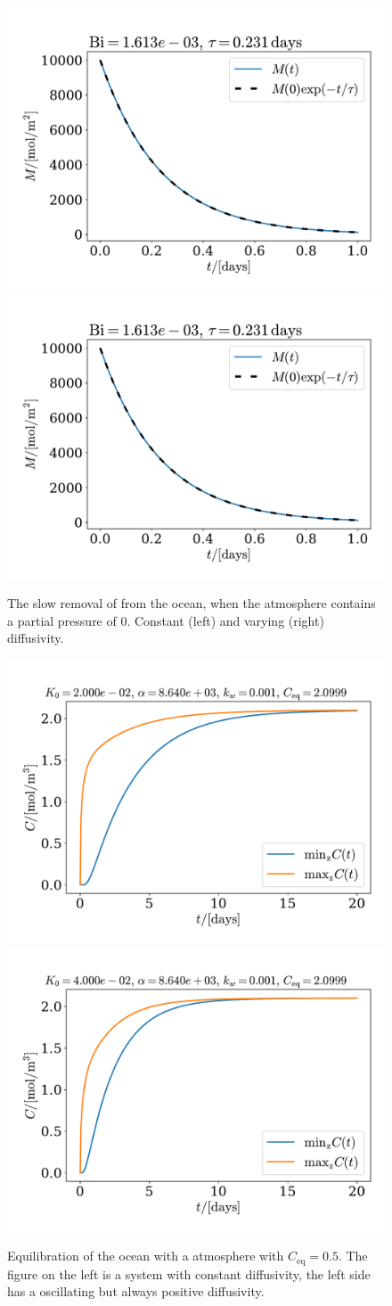 \documentclass{article}
\begin{document}
    \begin{figure}[H]
        \centering
        \includegraphics[width=.49\textwidth]{../plots/test4_decay}
        \includegraphics[width=.49\textwidth]{../plots/test4_varK_decay}
        \caption{The slow removal of  from the ocean, when the atmosphere contains a partial pressure of 0. Constant (left) and varying (right) diffusivity.}
        \label{decay}
    \end{figure}

    \begin{figure}[H]
        \centering
        \includegraphics[width=.49\textwidth]{../plots/test5_minmax}
        \includegraphics[width=.49\textwidth]{../plots/test5_varK_minmax}
        \caption{Equilibration of the ocean with a atmosphere with $C_\mathrm{eq}=0.5$. The figure on the left is a system with constant diffusivity, the left side has a oscillating but always positive diffusivity.}
        \label{minmax}
    \end{figure}
\end{document}
